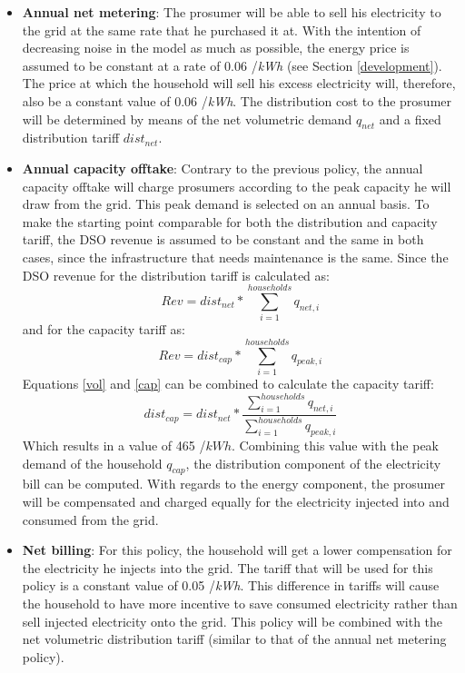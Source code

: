\begin{itemize}
\item \textbf{Annual net metering}: The prosumer will be able to sell his electricity to the grid at the same rate that he purchased it at. With the intention of decreasing noise in the model as much as possible, the energy price is assumed to be constant at a rate of 0.06 \EUR{}/\textit{kWh} (see Section \ref{development}). The price at which the household will sell his excess electricity will, therefore, also be a constant value of 0.06 \EUR{}/\textit{kWh}. The distribution cost to the prosumer will be determined by means of the net volumetric demand $q_{net}$ and a fixed distribution tariff $dist_{net}$.
\item \textbf{Annual capacity offtake}: Contrary to the previous policy, the annual capacity offtake will charge prosumers according to the peak capacity he will draw from the grid. This peak demand is selected on an annual basis. To make the starting point comparable for both the distribution and capacity tariff, the DSO revenue is assumed to be constant and the same in both cases, since the infrastructure that needs maintenance is the same. Since the DSO revenue for the distribution tariff is calculated as:
\begin{equation} \label{vol}
    Rev = dist_{net}*\sum^{households}_{i=1} q_{net,i}
\end{equation}
		and for the capacity tariff as:
\begin{equation} \label{cap}
    Rev = dist_{cap}*\sum^{households}_{i=1} q_{peak,i}
\end{equation}
Equations \ref{vol} and \ref{cap} can be combined to calculate the capacity tariff:
\begin{equation}
    dist_{cap} = dist_{net}*\frac{\sum^{households}_{i=1} q_{net,i}}{\sum^{ households}_{i=1} q_{peak,i}}
\end{equation}
Which results in a value of 465 \EUR{}/$kWh$. Combining this value with the peak demand of the household $q_{cap}$, the distribution component of the electricity bill can be computed. With regards to the energy component, the prosumer will be compensated and charged equally for the electricity injected into and consumed from the grid. 
\item \textbf{Net billing}: For this policy, the household will get a lower compensation for the electricity he injects into the grid. The tariff that will be used for this policy is a constant value of 0.05 \EUR{}/\textit{kWh}. This difference in tariffs will cause the household to have more incentive to save consumed electricity rather than sell injected electricity onto the grid. This policy will be combined with the net volumetric distribution tariff (similar to that of the annual net metering policy). 

\end{itemize}

